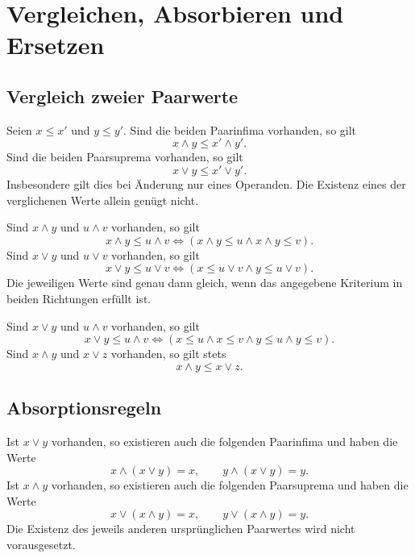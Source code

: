 \chapter{Vergleichen, Absorbieren und Ersetzen}
\label{b14guide:ch:calculus}

\section{Vergleich zweier Paarwerte}

\begin{theorem}
\label{b14guide:thm:monotone}
Seien $x\leq x'$ und $y\leq y'$. Sind die beiden
Paarinfima vorhanden, so gilt
\[
 x\wedge y\leq x'\wedge y'.
\]
Sind die beiden Paarsuprema vorhanden, so gilt
\[
 x\vee y\leq x'\vee y'.
\]
Insbesondere gilt dies bei Änderung nur eines Operanden.
Die Existenz eines der verglichenen Werte allein genügt nicht.
\end{theorem}

\begin{theorem}
\label{b14guide:thm:compare-pairs}
Sind $x\wedge y$ und $u\wedge v$ vorhanden, so gilt
\[
 x\wedge y\leq u\wedge v
 \Longleftrightarrow
 (x\wedge y\leq u\land x\wedge y\leq v).
\]
Sind $x\vee y$ und $u\vee v$ vorhanden, so gilt
\[
 x\vee y\leq u\vee v
 \Longleftrightarrow
 (x\leq u\vee v\land y\leq u\vee v).
\]
Die jeweiligen Werte sind genau dann gleich, wenn das
angegebene Kriterium in beiden Richtungen erfüllt ist.
\end{theorem}

\begin{theorem}
\label{b14guide:thm:cross}
Sind $x\vee y$ und $u\wedge v$ vorhanden, so gilt
\[
 x\vee y\leq u\wedge v
 \Longleftrightarrow
 (x\leq u\land x\leq v\land y\leq u\land y\leq v).
\]
Sind $x\wedge y$ und $x\vee z$ vorhanden, so gilt stets
\[
 x\wedge y\leq x\vee z.
\]
\end{theorem}

\section{Absorptionsregeln}

\begin{theorem}
\label{b14guide:thm:absorption}
Ist $x\vee y$ vorhanden, so existieren auch die folgenden
Paarinfima und haben die Werte
\[
 x\wedge(x\vee y)=x,\qquad
 y\wedge(x\vee y)=y.
\]
Ist $x\wedge y$ vorhanden, so existieren auch die folgenden
Paarsuprema und haben die Werte
\[
 x\vee(x\wedge y)=x,\qquad
 y\vee(x\wedge y)=y.
\]
Die Existenz des jeweils anderen ursprünglichen Paarwertes
wird nicht vorausgesetzt.
\end{theorem}

